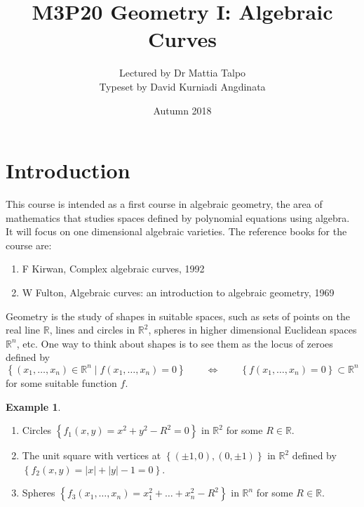 \documentclass{article}
\title{M3P20 Geometry I: Algebraic Curves}
\author{Lectured by Dr Mattia Talpo \\ Typeset by David Kurniadi Angdinata}
\date{Autumn 2018}
\newcommand{\R}{\mathbb{R}}
\newcommand{\rb}[1]{\left( #1 \right)}
\newcommand{\cb}[1]{\left\{ #1 \right\}}
\newcommand{\abs}[1]{\left\lvert #1 \right\rvert}
\theoremstyle{definition}\newtheorem{definition}{Definition}[section]
\theoremstyle{definition}\newtheorem{notation}[definition]{Notation}
\theoremstyle{definition}\newtheorem{remark}[definition]{Remark}
\theoremstyle{definition}\newtheorem{example}[definition]{Example}
\theoremstyle{definition}\newtheorem{fact}{Fact}
\theoremstyle{definition}\newtheorem{exercise}{Exercise}
\begin{document}
\maketitle

\vfill

\tableofcontents

\pagebreak


\section{Introduction}

This course is intended as a first course in algebraic geometry, the area of mathematics that studies spaces defined by polynomial equations using algebra. It will focus on one dimensional algebraic varieties. The reference books for the course are:

\begin{enumerate}
\item F Kirwan, Complex algebraic curves, 1992
\item W Fulton, Algebraic curves: an introduction to algebraic geometry, 1969
\end{enumerate}

Geometry is the study of shapes in suitable spaces, such as sets of points on the real line $ \R $, lines and circles in $ \R^2 $, spheres in higher dimensional Euclidean spaces $ \R^n $, etc. One way to think about shapes is to see them as the locus of zeroes defined by
$$ \cb{\rb{x_1, \dots, x_n} \in \R^n \mid f\rb{x_1, \dots, x_n} = 0} \qquad \iff \qquad \cb{f\rb{x_1, \dots, x_n} = 0} \subset \R^n $$
for some suitable function $ f $.

\begin{example}
\hfill
\begin{enumerate}
\item Circles $ \cb{f_1\rb{x, y} = x^2 + y^2 - R^2 = 0} $ in $ \R^2 $ for some $ R \in \R $.
\item The unit square with vertices at $ \cb{\rb{\pm 1, 0}, \rb{0, \pm 1}} $ in $ \R^2 $ defined by $ \cb{f_2\rb{x, y} = \abs{x} + \abs{y} - 1 = 0} $.
\item Spheres $ \cb{f_3\rb{x_1, \dots, x_n} = x_1^2 + \dots + x_n^2 - R^2} $ in $ \R^n $ for some $ R \in \R $.
\end{enumerate}
\end{example}
\end{document}
